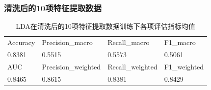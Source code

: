 \documentclass[10pt]{article}
\begin{document}
\subsubsection*{清洗后的10项特征提取数据}
\begin{table}[H]
  \centering
  \caption{LDA在清洗后的10项特征提取数据训练下各项评估指标均值}
  \begin{tabular}{llll}
  \toprule
  Accuracy & Precision\_macro & Recall\_macro & F1\_macro \\
  0.8381 & 0.5515 & 0.5573 & 0.5061 \\
  \midrule
  AUC & Precision\_weighted & Recall\_weighted & F1\_weighted \\
  0.8465 & 0.8615 & 0.8381 & 0.8429 \\
  \bottomrule
  \end{tabular}
\end{table}
\end{document}

